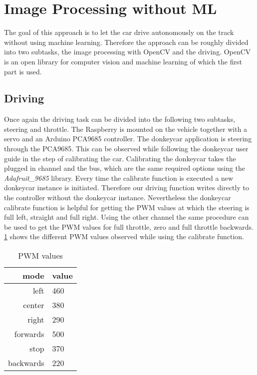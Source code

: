 \documentclass[conference]{IEEEtran}
\begin{document}
\section{Image Processing without ML}

The goal of this approach is to let the car drive autonomously on the track without using machine learning.
Therefore the approach can be roughly divided into two subtasks, the image processing with OpenCV and the driving.
OpenCV is an open library for computer vision and machine learning of which the first part is used.

\subsection{Driving}\label{subsec:driving}

Once again the driving task can be divided into the following two subtasks, steering and throttle.
The Raspberry is mounted on the vehicle together with a servo and an Arduino PCA9685 controller.
The donkeycar application is steering through the PCA9685.
This can be observed while following the donkeycar user guide in the step of calibrating the car.
Calibrating the donkeycar takes the plugged in channel and the bus, which are the same required options using the \textit{Adafruit\_9685} library.
Every time the calibrate function is executed a new donkeycar instance is initiated.
Therefore our driving function writes directly to the controller without the donkeycar instance.
Nevertheless the donkeycar calibrate function is helpful for getting the PWM values at which the steering is full left, straight and full right.
Using the other channel the same procedure can be used to get the PWM values for full throttle, zero and full throttle backwards.
\ref{tab:pwmval} shows the different PWM values observed while using the calibrate function.

\begin{table}[!t]
	\renewcommand{\arraystretch}{1.3}
	\caption{PWM values}
	\centering
	\begin{tabular}{r|l}
		mode&value\\
		\hline
		left & 460\\
		center & 380\\
		right & 290\\
		forwards & 500\\
		stop & 370\\
		backwards & 220\\
	\end{tabular}
	\label{tab:pwmval}
\end{table}
\end{document}

